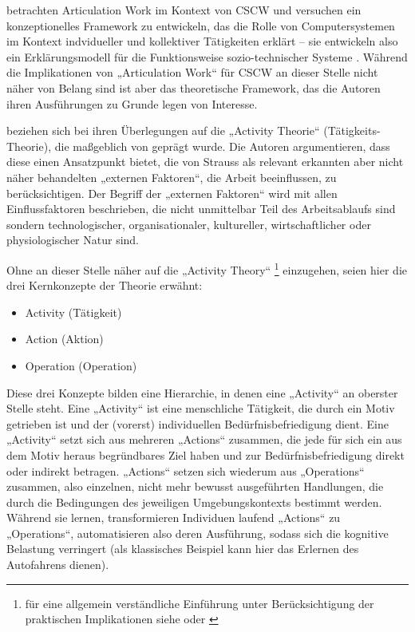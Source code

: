 \citet{Fjuk97} betrachten Articulation Work im Kontext von \gls{CSCW} und versuchen ein konzeptionelles Framework zu entwickeln, das die Rolle von Computersystemen im Kontext indvidueller und kollektiver Tätigkeiten erklärt -- sie entwickeln also ein Erklärungsmodell für die Funktionsweise sozio-technischer Systeme \citep{Emery60}. Während die Implikationen von „Articulation Work“ für \gls{CSCW} an dieser Stelle nicht näher von Belang sind ist aber das theoretische Framework, das die Autoren ihren Ausführungen zu Grunde legen von Interesse. 

\citet{Fjuk97} beziehen sich bei ihren Überlegungen auf die „Activity Theorie“ (Tätigkeits-Theorie), die maßgeblich von \citep{Leontev72} geprägt wurde. Die Autoren argumentieren, dass diese einen Ansatzpunkt bietet, die von Strauss als relevant erkannten aber nicht näher behandelten „externen Faktoren“, die Arbeit beeinflussen, zu berücksichtigen. Der Begriff der „externen Faktoren“ wird mit allen Einflussfaktoren beschrieben, die nicht unmittelbar Teil des Arbeitsablaufs sind sondern technologischer, organisationaler, kultureller, wirtschaftlicher oder physiologischer Natur sind. 

Ohne an dieser Stelle näher auf die „Activity Theory“ \footnote{für eine allgemein verständliche Einführung unter Berücksichtigung der praktischen Implikationen siehe \citet{Dahme97} oder \citet{Nardi06}} einzugehen, seien hier die drei Kernkonzepte der Theorie erwähnt:
\begin{itemize}
	\item Activity (Tätigkeit)
	\item Action (Aktion)
	\item Operation (Operation)
\end{itemize}

Diese drei Konzepte bilden eine Hierarchie, in denen eine „Activity“ an oberster Stelle steht. Eine „Activity“ ist eine menschliche Tätigkeit, die durch ein Motiv getrieben ist und der (vorerst) individuellen Bedürfnisbefriedigung dient. Eine „Activity“ setzt sich aus mehreren „Actions“ zusammen, die jede für sich ein aus dem Motiv heraus begründbares Ziel haben und zur Bedürfnisbefriedigung direkt oder indirekt betragen. „Actions“ setzen sich wiederum aus „Operations“ zusammen, also einzelnen, nicht mehr bewusst ausgeführten Handlungen, die durch die Bedingungen des jeweiligen Umgebungskontexts bestimmt werden. Während sie lernen, transformieren Individuen laufend „Actions“ zu „Operations“, automatisieren also deren Ausführung, sodass sich die kognitive Belastung verringert (als klassisches Beispiel kann hier das Erlernen des Autofahrens dienen).

